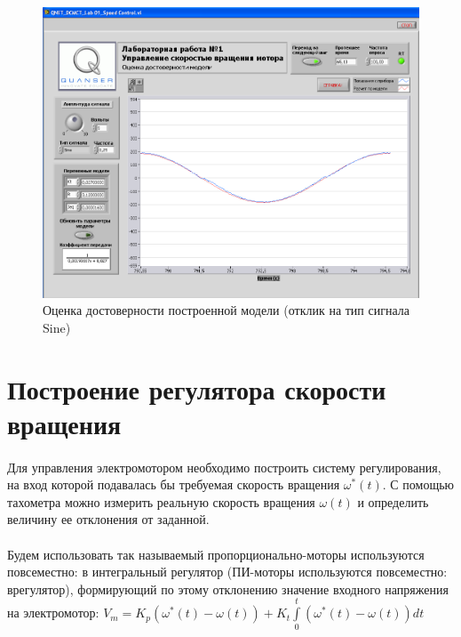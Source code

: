 \documentclass[12pt]{article}
\begin{document}
\begin{center}
	\begin{figure}
		\centering
		\includegraphics[scale=1.6]{sine}
		\caption{Оценка достоверности построенной модели (отклик на тип сигнала Sine)}
	\end{figure}
\end{center}
\vfill
\newpage


\section*{Построение регулятора скорости вращения}
\paragraph{}
Для управления электромотором необходимо построить
систему регулирования, на вход которой подавалась бы
требуемая скорость вращения $\omega^*(t)$. С помощью тахометра
можно измерить реальную скорость вращения $\omega(t)$ и
определить величину ее отклонения от заданной.
\paragraph{}
Будем использовать так называемый пропорционально-моторы используются повсеместно: в
интегральный регулятор (ПИ-моторы используются повсеместно: врегулятор), формирующий по этому отклонению значение входного напряжения на электромотор:
$V_m = K_p(\omega^*(t) - \omega(t))+K_t\int\limits_0^t(\omega^*(t) - \omega(t))dt$\hfill\break
\end{document}
